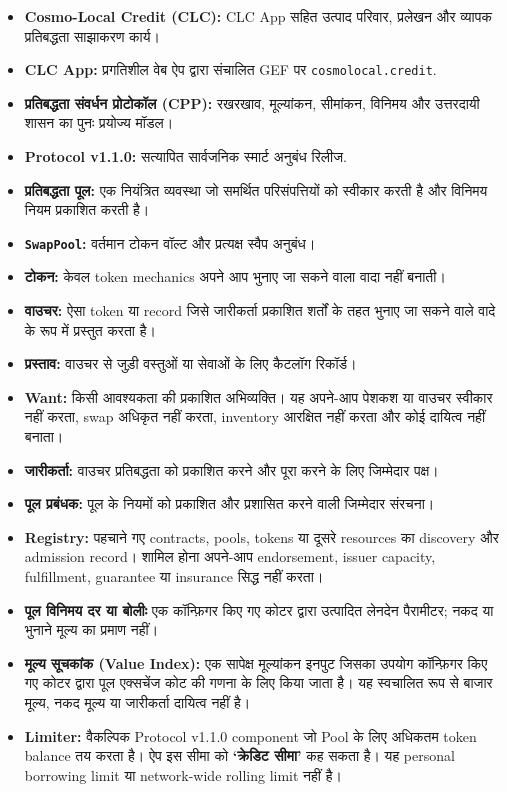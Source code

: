 \documentclass[11pt]{article}
\begin{document}
\begin{itemize}[leftmargin=*]
\item \textbf{Cosmo-Local Credit (CLC):} CLC App सहित उत्पाद परिवार, प्रलेखन और व्यापक प्रतिबद्धता साझाकरण कार्य।
\item \textbf{CLC App:} प्रगतिशील वेब ऐप द्वारा संचालित GEF पर \texttt{cosmolocal.credit}.
\item \textbf{प्रतिबद्धता संवर्धन प्रोटोकॉल (CPP):} रखरखाव, मूल्यांकन, सीमांकन, विनिमय और उत्तरदायी शासन का पुनः प्रयोज्य मॉडल।
\item \textbf{Protocol v1.1.0:} सत्यापित सार्वजनिक स्मार्ट अनुबंध रिलीज.
\item \textbf{प्रतिबद्धता पूल:} एक नियंत्रित व्यवस्था जो समर्थित परिसंपत्तियों को स्वीकार करती है और विनिमय नियम प्रकाशित करती है।
\item \textbf{\texttt{SwapPool}:} वर्तमान टोकन वॉल्ट और प्रत्यक्ष स्वैप अनुबंध।
\item \textbf{टोकन:} केवल token mechanics अपने आप भुनाए जा सकने वाला वादा नहीं बनाती।
\item \textbf{वाउचर:} ऐसा token या record जिसे जारीकर्ता प्रकाशित शर्तों के तहत भुनाए जा सकने वाले वादे के रूप में प्रस्तुत करता है।
\item \textbf{प्रस्ताव:} वाउचर से जुड़ी वस्तुओं या सेवाओं के लिए कैटलॉग रिकॉर्ड।
\item \textbf{Want:} किसी आवश्यकता की प्रकाशित अभिव्यक्ति। यह अपने-आप पेशकश या वाउचर स्वीकार नहीं करता, swap अधिकृत नहीं करता, inventory आरक्षित नहीं करता और कोई दायित्व नहीं बनाता।
\item \textbf{जारीकर्ता:} वाउचर प्रतिबद्धता को प्रकाशित करने और पूरा करने के लिए जिम्मेदार पक्ष।
\item \textbf{पूल प्रबंधक:} पूल के नियमों को प्रकाशित और प्रशासित करने वाली जिम्मेदार संरचना।
\item \textbf{Registry:} पहचाने गए contracts, pools, tokens या दूसरे resources का discovery और admission record। शामिल होना अपने-आप endorsement, issuer capacity, fulfillment, guarantee या insurance सिद्ध नहीं करता।
\item \textbf{पूल विनिमय दर या बोलीः} एक कॉन्फ़िगर किए गए कोटर द्वारा उत्पादित लेनदेन पैरामीटर; नकद या भुनाने मूल्य का प्रमाण नहीं।
\item \textbf{मूल्य सूचकांक (Value Index):} एक सापेक्ष मूल्यांकन इनपुट जिसका उपयोग कॉन्फ़िगर किए गए कोटर द्वारा पूल एक्सचेंज कोट की गणना के लिए किया जाता है। यह स्वचालित रूप से बाजार मूल्य, नकद मूल्य या जारीकर्ता दायित्व नहीं है।
\item \textbf{Limiter:} वैकल्पिक Protocol v1.1.0 component जो Pool के लिए अधिकतम token balance तय करता है। ऐप इस सीमा को \textbf{`क्रेडिट सीमा'} कह सकता है। यह personal borrowing limit या network-wide rolling limit नहीं है।

\end{itemize}
\end{document}
